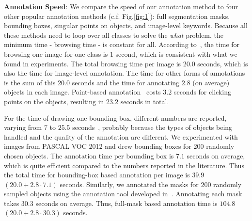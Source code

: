 \documentclass[runningheads]{llncs}
\begin{document}


\textbf{Annotation Speed}: We compare the speed of our annotation
method to four other popular annotation methods
(c.f. Fig.\ref{fig:1}): full segmentation masks, bounding boxes,
singular points on objects, and image-level keywords.  Because all these
methods need to loop over all classes to solve the \emph{what}
problem, the minimum time - browsing time - is constant for
all. According to~\citep{whatpoint}, the time for browsing one image
for one class is 1 second, which is consistent with what we found
in experiments. 
The total browsing time per image is  $20.0$ seconds, which is also the time for
image-level annotation.  The time for other forms of annotations is
the sum of this $20.0$ seconds and the time for annotating $2.8$ (on
average) objects in each image. Point-based
annotation~\citep{whatpoint} costs $3.2$ seconds for clicking points on
the objects, resulting in $23.2$ seconds in total.

For the time of drawing one bounding box, different
numbers are reported, varying from $7$ to $25.5$
seconds~\citep{best:two:world, annotation:strength}, probably because
the types of objects being handled and the quality of the annotation
are different. We experimented with images from PASCAL VOC 2012
and drew bounding boxes for $200$ randomly chosen objects. 
The annotation time per bounding box is $7.1$ seconds on average,
which is quite efficient compared to the numbers reported in the
literature. Thus the total time for bounding-box based annotation per image is
$39.9$ $(20.0+2.8 \cdot 7.1)$ seconds. Similarly, we annotated the masks for
$200$ randomly sampled objects using the annotation tool developed
in~\citep{open:surface}.
Annotating each mask takes $30.3$ seconds on
average. Thus, full-mask based annotation time is $104.8$
$(20.0+2.8\cdot 30.3)$ seconds.   %
\end{document}
